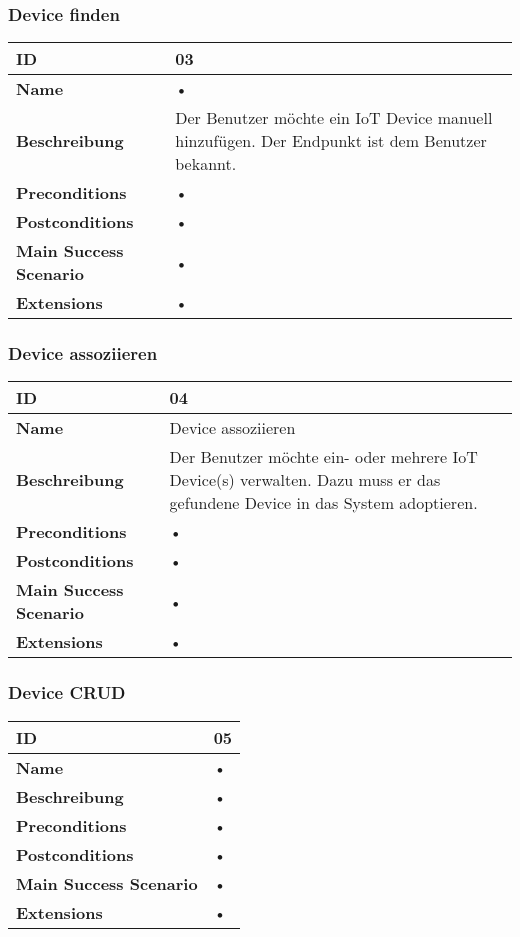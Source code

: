 \subsubsection{Device finden}
\mbox{}
\begin{longtable}{| p{4cm} | p{11.7cm} |}
 \hline
 \textbf{ID} & 03\\ \hline 
 \textbf{Name} & • \\ \hline 
 \textbf{Beschreibung} & Der Benutzer möchte ein IoT Device manuell hinzufügen. Der Endpunkt ist dem Benutzer bekannt. \\ \hline 
 \textbf{Preconditions} & • \\ \hline 
 \textbf{Postconditions} & • \\ \hline 
 \textbf{Main Success Scenario} & • \\ \hline 
 \textbf{Extensions} & • \\ \hline 
 \end{longtable}
 
\subsubsection{Device assoziieren}
\mbox{}
\begin{longtable}{| p{4cm} | p{11.7cm} |}
 \hline
 \textbf{ID} & 04\\ \hline 
 \textbf{Name} & Device assoziieren \\ \hline 
 \textbf{Beschreibung} & Der Benutzer möchte ein- oder mehrere IoT Device(s) verwalten. Dazu muss er das gefundene Device in das System adoptieren. \\ \hline 
 \textbf{Preconditions} & • \\ \hline 
 \textbf{Postconditions} & • \\ \hline 
 \textbf{Main Success Scenario} & • \\ \hline 
 \textbf{Extensions} & • \\ \hline 
 \end{longtable}
 
\subsubsection{Device CRUD}
\mbox{}
\begin{longtable}{| p{4cm} | p{11.7cm} |}
 \hline
 \textbf{ID} & 05\\ \hline 
 \textbf{Name} & • \\ \hline 
 \textbf{Beschreibung} & • \\ \hline 
 \textbf{Preconditions} & • \\ \hline 
 \textbf{Postconditions} & • \\ \hline 
 \textbf{Main Success Scenario} & • \\ \hline 
 \textbf{Extensions} & • \\ \hline 
 \end{longtable}
 
